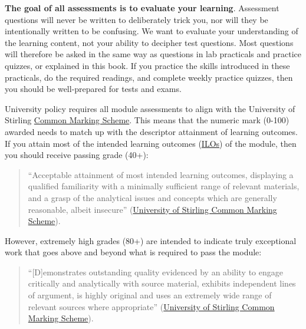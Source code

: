 \documentclass[
]{scrbook}
\begin{document}
\textbf{The goal of all assessments is to evaluate your learning}.
Assessment questions will never be written to deliberately trick you, nor will they be intentionally written to be confusing.
We want to evaluate your understanding of the learning content, not your ability to decipher test questions.
Most questions will therefore be asked in the same way as questions in lab practicals and practice quizzes, or explained in this book.
If you practice the skills introduced in these practicals, do the required readings, and complete weekly practice quizzes, then you should be well-prepared for tests and exams.

University policy requires all module assessments to align with the University of Stirling \href{https://www.stir.ac.uk/about/professional-services/student-academic-and-corporate-services/academic-registry/academic-policy-and-practice/quality-handbook/assessment-policy-and-procedure/appendix-1-undergraduate-common-marking-scheme/}{Common Marking Scheme}.
This means that the numeric mark (0-100) awarded needs to match up with the descriptor attainment of learning outcomes.
If you attain most of the intended learning outcomes (\protect\hyperlink{ILOs}{ILOs}) of the module, then you should receive passing grade (40+):

\begin{quote}
``Acceptable attainment of most intended learning outcomes, displaying a qualified familiarity with a minimally sufficient range of relevant materials, and a grasp of the analytical issues and concepts which are generally reasonable, albeit insecure'' (\href{https://www.stir.ac.uk/about/professional-services/student-academic-and-corporate-services/academic-registry/academic-policy-and-practice/quality-handbook/assessment-policy-and-procedure/appendix-1-undergraduate-common-marking-scheme/}{University of Stirling Common Marking Scheme}).
\end{quote}

However, extremely high grades (80+) are intended to indicate truly exceptional work that goes above and beyond what is required to pass the module:

\begin{quote}
``{[}D{]}emonstrates outstanding quality evidenced by an ability to engage critically and analytically with source material, exhibits independent lines of argument, is highly original and uses an extremely wide range of relevant sources where appropriate'' (\href{https://www.stir.ac.uk/about/professional-services/student-academic-and-corporate-services/academic-registry/academic-policy-and-practice/quality-handbook/assessment-policy-and-procedure/appendix-1-undergraduate-common-marking-scheme/}{University of Stirling Common Marking Scheme}).
\end{quote}
\end{document}

